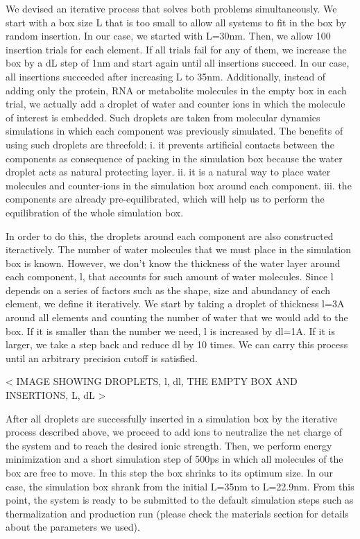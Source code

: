 \documentclass[journal=jacsat,manuscript=article]{achemso}
\begin{document}
We devised an iterative process that solves both problems simultaneously. We start with a box size L that is too small to allow all systems to fit in the box by random insertion. In our case, we started with L=30nm. Then, we allow 100 insertion trials for each element. If all trials fail for any of them, we increase the box by a dL step of 1nm and start again until all insertions succeed. In our case, all insertions succeeded after increasing L to 35nm. Additionally, instead of adding only the protein, RNA or metabolite molecules in the empty box in each trial, we actually add a droplet of water and counter ions in which the molecule of interest is embedded. Such droplets are taken from molecular dynamics simulations in which each component was previously simulated. The benefits of using such droplets are threefold: i. it prevents artificial contacts between the components as consequence of packing in the simulation box because the water droplet acts as natural protecting layer. ii. it is a natural way to place water molecules and counter-ions in the simulation box around each component. iii. the components are already pre-equilibrated, which will help us to perform the equilibration of the whole simulation box.

In order to do this, the droplets around each component are also constructed iteractively. The number of water molecules that we must place in the simulation box is known. However, we don't know the thickness of the water layer around each component, l, that accounts for such amount of water molecules. Since l depends on a series of factors such as the shape, size and abundancy of each element, we define it iteratively. We start by taking a droplet of thickness l=3A around all elements and counting the number of water that we would add to the box. If it is smaller than the number we need, l is increased by dl=1A. If it is larger, we take a step back and reduce dl by 10 times. We can carry this process until an arbitrary precision cutoff is satisfied.


< IMAGE SHOWING DROPLETS, l, dl, THE EMPTY BOX AND INSERTIONS, L, dL >


After all droplets are successfully inserted in a simulation box by the iterative process described above, we proceed to add ions to neutralize the net charge of the system and to reach the desired ionic strength. Then, we perform energy minimization and a short simulation step of 500ps in which all molecules of the box are free to move. In this step the box shrinks to its optimum size. In our case, the simulation box shrank from the initial L=35nm to L=22.9nm. From this point, the system is ready to be submitted to the default simulation steps such as thermalization and production run (please check the materials section for details about the parameters we used).
\end{document}
